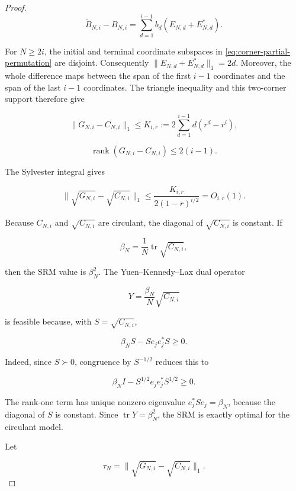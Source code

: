 \begin{proof}
\begin{equation}\label{eq:corner-partial-permutation}
\widetilde B_{N,i}-B_{N,i}
=\sum_{d=1}^{i-1}b_d(E_{N,d}+E_{N,d}^*).
\end{equation}

For \(N\ge2i\), the initial and terminal coordinate subspaces in
\eqref{eq:corner-partial-permutation} are disjoint. Consequently
\(\|E_{N,d}+E_{N,d}^*\|_1=2d\). Moreover, the whole difference maps between
the span of the first \(i-1\) coordinates and the span of the last \(i-1\)
coordinates. The triangle inequality and this two-corner support therefore give

\begin{equation}\label{eq:circulant-trace-perturbation}
\|G_{N,i}-C_{N,i}\|_1
\le K_{i,r}:=2\sum_{d=1}^{i-1}d(r^d-r^i),
\end{equation}

\begin{equation}\label{eq:circulant-rank-perturbation}
\operatorname{rank}(G_{N,i}-C_{N,i})\le2(i-1).
\end{equation}

The Sylvester integral gives

\begin{equation}\label{eq:sqrt-trace-perturbation}
\|\sqrt{G_{N,i}}-\sqrt{C_{N,i}}\|_1
\le\frac{K_{i,r}}{2(1-r)^{i/2}}=O_{i,r}(1).
\end{equation}

Because \(C_{N,i}\) and \(\sqrt{C_{N,i}}\) are circulant, the diagonal of \(\sqrt{C_{N,i}}\) is constant. If

\[
\beta_N=\frac1N\operatorname{tr}\sqrt{C_{N,i}},
\]

then the SRM value is \(\beta_N^2\). The Yuen--Kennedy--Lax dual operator

\[
Y=\frac{\beta_N}{N}\sqrt{C_{N,i}}
\]

is feasible because, with \(S=\sqrt{C_{N,i}}\),

\[
\beta_NS-Se_je_j^*S\ge0.
\]

Indeed, since \(S\succ0\), congruence by \(S^{-1/2}\) reduces this to

\[
\beta_N I-S^{1/2}e_je_j^*S^{1/2}\ge0.
\]

The rank-one term has unique nonzero eigenvalue \(e_j^*Se_j=\beta_N\), because the diagonal of \(S\) is constant. Since \(\operatorname{tr}Y=\beta_N^2\), the SRM is exactly optimal for the circulant model.

Let

\[
\tau_N=\|\sqrt{G_{N,i}}-\sqrt{C_{N,i}}\|_1.
\]


\end{proof}

